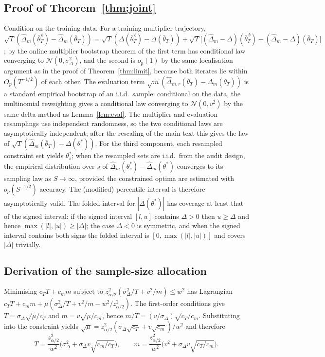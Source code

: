 \documentclass[pdflatex,sn-basic]{sn-jnl}
\newcommand{\dhat}{\hat\Delta}
\newcommand{\tbar}{\bar\theta}
\begin{document}
\subsection{Proof of Theorem~\ref{thm:joint}}
Condition on the training data.  For a training multiplier trajectory,
$\sqrt T(\dhat_m(\bar\theta_T^{\,b})-\dhat_m(\tbar_T))=\sqrt T(\Delta(\bar\theta_T^{\,b})-\Delta(\tbar_T))+\sqrt T\big[(\dhat_m-\Delta)(\bar\theta_T^{\,b})-(\dhat_m-\Delta)(\tbar_T)\big]$;
by the online multiplier bootstrap theorem of \citet{roy2026uq} the first term has conditional law
converging to $\mathcal N(0,\sigma^2_\Delta)$, and the second is $o_p(1)$ by the same localisation
argument as in the proof of Theorem~\ref{thm:limit}, because both iterates lie within
$O_p(T^{-1/2})$ of each other.  The evaluation term
$\sqrt m(\dhat_{m,r}(\tbar_T)-\dhat_m(\tbar_T))$ is a standard empirical bootstrap of an i.i.d.\
sample: conditional on the data, the multinomial reweighting gives a conditional law converging to
$\mathcal N(0,v^2)$ by the same delta method as Lemma~\ref{lem:eval}.  The multiplier and evaluation
resamplings use independent randomness, so the two conditional laws are asymptotically independent;
after the rescaling of the main text this gives the law of
$\sqrt T(\dhat_m(\tbar_T)-\Delta(\theta^*))$.  For the third component, each resampled constraint set
yields $\theta^*_s$; when the resampled sets are i.i.d.\ from the audit design, the empirical
distribution over $s$ of $\dhat_m(\theta^*_s)-\dhat_m(\theta^*)$ converges to its sampling law as
$S\to\infty$, provided the constrained optima are estimated with $o_p(S^{-1/2})$ accuracy.  The
(modified) percentile interval is therefore asymptotically valid.  The folded interval for
$|\Delta(\theta^*)|$ has coverage at least that of the signed interval: if the signed interval $[l,u]$
contains $\Delta>0$ then $u\ge\Delta$ and hence $\max(|l|,|u|)\ge|\Delta|$; the case $\Delta<0$ is
symmetric, and when the signed interval contains both signs the folded interval is $[0,\max(|l|,|u|)]$
and covers $|\Delta|$ trivially.

\subsection{Derivation of the sample-size allocation}
Minimising $c_T T+c_m m$ subject to $z^2_{\alpha/2}(\sigma^2_\Delta/T+v^2/m)\le w^2$ has Lagrangian
$c_T T+c_m m+\mu(\sigma^2_\Delta/T+v^2/m-w^2/z^2_{\alpha/2})$.  The first-order conditions give
$T=\sigma_\Delta\sqrt{\mu/c_T}$ and $m=v\sqrt{\mu/c_m}$, hence
$m/T=(v/\sigma_\Delta)\sqrt{c_T/c_m}$.  Substituting into the constraint yields
$\sqrt\mu=z^2_{\alpha/2}(\sigma_\Delta\sqrt{c_T}+v\sqrt{c_m})/w^2$ and therefore
\[
T=\frac{z^2_{\alpha/2}}{w^2}\Big(\sigma^2_\Delta+\sigma_\Delta v\sqrt{c_m/c_T}\Big),
\qquad
m=\frac{z^2_{\alpha/2}}{w^2}\Big(v^2+\sigma_\Delta v\sqrt{c_T/c_m}\Big).
\]
\end{document}
